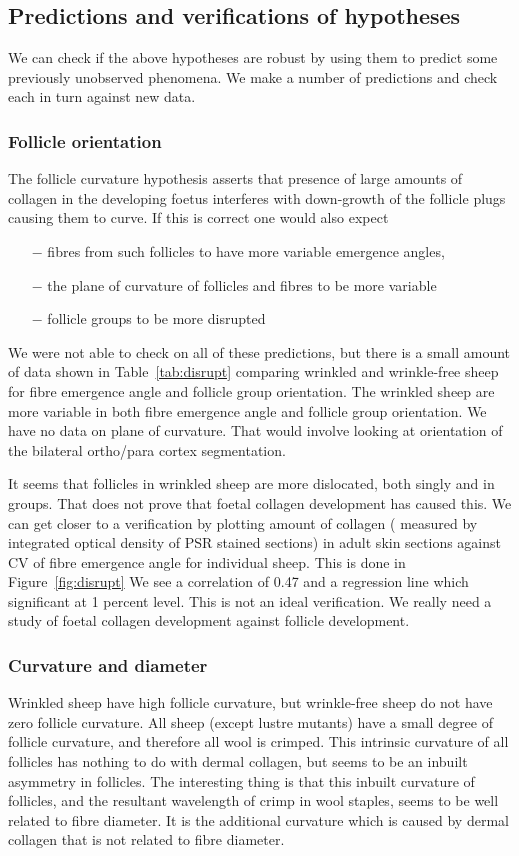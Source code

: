 \documentclass{article}
\begin{document}
\subsection{Predictions and verifications of hypotheses}
We can check if the above hypotheses are robust by using them to predict some previously unobserved phenomena. We make a number of predictions and check each in turn against new data.


\subsubsection{Follicle orientation}
The follicle curvature hypothesis asserts that presence of large amounts of collagen in the developing foetus interferes with down-growth of the follicle plugs causing them to curve. If this is correct one would also expect 
\small
\begin{itemize}
\item[$-$] fibres from such follicles to have more variable emergence angles, 
\item[$-$] the plane of curvature of follicles and fibres to be more variable
\item[$-$] follicle groups to be more disrupted
\end{itemize}
\normalsize
We were not able to check on all of these predictions, but there is a small amount of data shown in Table~\ref{tab:disrupt} comparing wrinkled and wrinkle-free sheep for fibre emergence angle and follicle group orientation.
%
The wrinkled sheep are more variable in both fibre emergence angle and follicle group orientation. We have no data on plane of curvature. That would involve looking at orientation of the bilateral ortho/para cortex segmentation.

It seems that follicles in wrinkled sheep are more dislocated, both singly and in groups. That does not prove that foetal collagen development  has caused this.  We can get closer to a verification by plotting amount of collagen ( measured by integrated optical density of PSR stained sections) in adult skin sections against CV of fibre emergence angle for individual sheep. This is done in Figure~\ref{fig:disrupt}
%
We see a correlation of 0.47  and a regression line which significant at 1 percent level.  This is not an ideal verification. We really need a study of foetal collagen development against follicle development.

\subsubsection{Curvature and diameter}
Wrinkled sheep have high follicle curvature, but wrinkle-free sheep do not have zero follicle curvature. All sheep (except lustre mutants) have a small degree of follicle curvature, and therefore all wool is crimped. This intrinsic curvature of all follicles has nothing to do with dermal collagen, but seems to be an inbuilt asymmetry in follicles. The interesting thing is that this inbuilt curvature of follicles, and the resultant wavelength of crimp in wool staples, seems to be well related to fibre diameter.  It is the additional curvature which is caused by dermal collagen that is not related to fibre diameter. 
\end{document}
